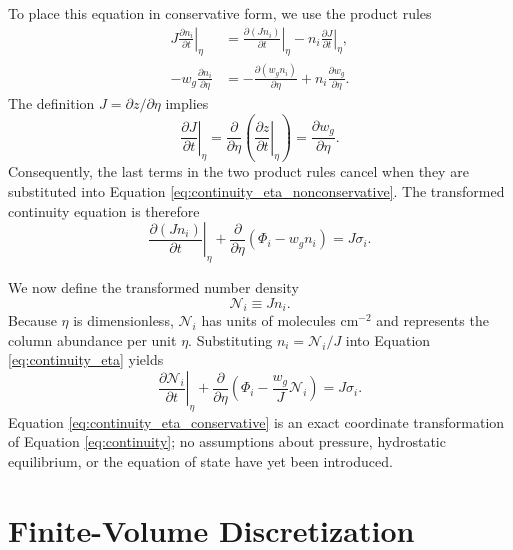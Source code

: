 \documentclass[twocolumn]{aastex631}
\begin{document}
To place this equation in conservative form, we use the product rules
\begin{align}
  J\left.\frac{\partial n_i}{\partial t}\right|_\eta
  &=
  \left.\frac{\partial(Jn_i)}{\partial t}\right|_\eta
  - n_i\left.\frac{\partial J}{\partial t}\right|_\eta, \\
  -w_g\frac{\partial n_i}{\partial\eta}
  &=
  -\frac{\partial(w_gn_i)}{\partial\eta}
  +n_i\frac{\partial w_g}{\partial\eta}.
  \label{eq:product_rules}
\end{align}
The definition $J=\partial z/\partial\eta$ implies
\begin{equation}
  \left.\frac{\partial J}{\partial t}\right|_\eta
  =
  \frac{\partial}{\partial\eta}
  \left(\left.\frac{\partial z}{\partial t}\right|_\eta\right)
  = \frac{\partial w_g}{\partial\eta}.
  \label{eq:geometric_conservation}
\end{equation}
Consequently, the last terms in the two product rules cancel when they
are substituted into Equation \eqref{eq:continuity_eta_nonconservative}.
The transformed continuity equation is therefore
\begin{equation}
  \left.\frac{\partial(Jn_i)}{\partial t}\right|_\eta
  + \frac{\partial}{\partial\eta}\left(\Phi_i-w_gn_i\right)
  = J\sigma_i .
  \label{eq:continuity_eta}
\end{equation}

We now define the transformed number density
\begin{equation}
  \mathcal{N}_i \equiv Jn_i .
  \label{eq:transformed_number_density}
\end{equation}
Because $\eta$ is dimensionless, $\mathcal{N}_i$ has units of molecules
cm$^{-2}$ and represents the column abundance per unit $\eta$. Substituting
$n_i=\mathcal{N}_i/J$ into Equation \eqref{eq:continuity_eta} yields
\begin{equation}
  \boxed{
  \left.\frac{\partial\mathcal{N}_i}{\partial t}\right|_\eta
  + \frac{\partial}{\partial\eta}
  \left(
    \Phi_i-\frac{w_g}{J}\mathcal{N}_i
  \right)
  = J\sigma_i
  }.
  \label{eq:continuity_eta_conservative}
\end{equation}
Equation \eqref{eq:continuity_eta_conservative} is an exact coordinate
transformation of Equation \eqref{eq:continuity}; no assumptions about
pressure, hydrostatic equilibrium, or the equation of state have yet been
introduced.

\section{Finite-Volume Discretization} \label{sec:finite_volume}
\end{document}

